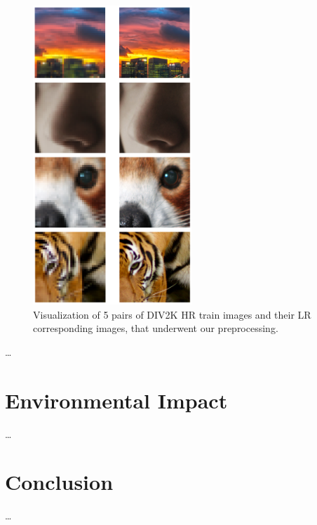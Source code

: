 \documentclass{article}
\begin{document}
{        \begin{figure}[ht]
            \centering
            \includegraphics[width=6cm]{images/DIV2K_HRLR.png}
            \caption{Visualization of 5 pairs of DIV2K HR train images and their LR corresponding images, that underwent our preprocessing.}
            \label{fig:div2k-train-pair}
        \end{figure}

        
    …
}

{
    \section{Environmental Impact}
    \label{sec:env-impact}

    …
}

{
    \section{Conclusion}
    \label{sec:conclusion}

    …
}

{
    
}
\end{document}
